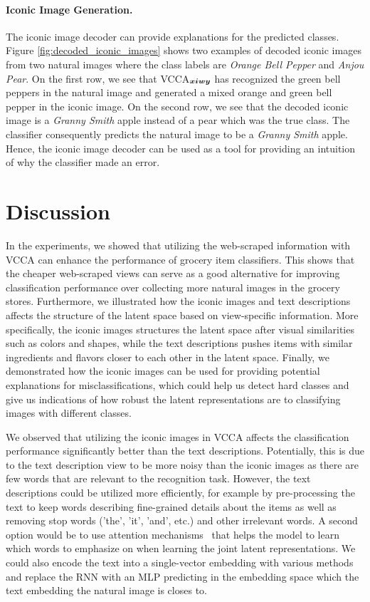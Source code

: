 \paragraph{Iconic Image Generation.} The iconic image decoder can provide explanations for the predicted classes. Figure \ref{fig:decoded_iconic_images} shows two examples of decoded iconic images from two natural images where the class labels are \textit{Orange Bell Pepper} and \textit{Anjou Pear}. On the first row, we see that VCCA$_{{\bm{x}} {\bm{i}} {\bm{w}} {\bm{y}}}$ has recognized the green bell peppers in the natural image and generated a mixed orange and green bell pepper in the iconic image. On the second row, we see that the decoded iconic image is a \textit{Granny Smith} apple instead of a pear which was the true class. The classifier consequently predicts the natural image to be a \textit{Granny Smith} apple. Hence, the iconic image decoder can be used as a tool for providing an intuition of why the classifier made an error. 



\section{Discussion}

In the experiments, we showed that utilizing the web-scraped information with VCCA can enhance the performance of grocery item classifiers. This shows that the cheaper web-scraped views can serve as a good alternative for improving classification performance over collecting more natural images in the grocery stores. Furthermore, we illustrated how the iconic images and text descriptions affects the structure of the latent space based on view-specific information. More specifically, the iconic images structures the latent space after visual similarities such as colors and shapes, while the text descriptions pushes items with similar ingredients and flavors closer to each other in the latent space. Finally, we demonstrated how the iconic images can be used for providing potential explanations for misclassifications, which could help us detect hard classes and give us indications of how robust the latent representations are to classifying images with different classes. 

We observed that utilizing the iconic images in VCCA affects the classification performance significantly better than the text descriptions. Potentially, this is due to the text description view to be more noisy than the iconic images as there are few words that are relevant to the recognition task. However, the text descriptions could be utilized more efficiently, for example by pre-processing the text to keep words describing fine-grained details about the items as well as removing stop words ('the', 'it', 'and', etc.) and other irrelevant words. A second option would be to use attention mechanisms~\cite{luong2015effective, vaswani2017attention} that helps the model to learn which words to emphasize on when learning the joint latent representations. We could also encode the text into a single-vector embedding with various methods~\cite{mikolov2013distributed, pennington2014glove, lan2019albert} and replace the RNN with an MLP predicting in the embedding space which the text embedding the natural image is closes to. 

